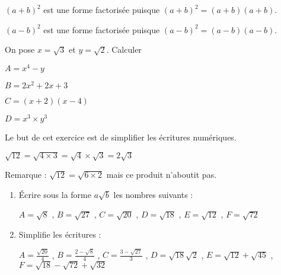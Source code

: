 \documentclass[10pt]{article}
\begin{document}
\begin{Rq}

$(a+b)^2$ est une forme factorisée puisque $(a+b)^2=(a+b)(a+b)$.

$(a-b)^2$ est une forme factorisée puisque $(a-b)^2=(a-b)(a-b)$.
\end{Rq}

 
\begin{minipage}{0.55\linewidth}
\end{minipage}
\begin{minipage}{0.45\linewidth}
\end{minipage}





On pose $x = \sqrt{3}$ et $y=\sqrt{2}$. Calculer

\begin{enumerate}
\begin{minipage}{0.25\linewidth}
\item $A = x^4-y$
\end{minipage}
\begin{minipage}{0.25\linewidth}
\item $B = 2x^2+2x+3$
\end{minipage}
\begin{minipage}{0.25\linewidth}
\item $C = (x+2)(x-4)$
\end{minipage}
\begin{minipage}{0.25\linewidth}
\item $D = x^3 \times y^3$
\end{minipage}
\end{enumerate}




Le but de cet exercice est de simplifier les écritures numériques.

\begin{Ex}
$\sqrt{12} = \sqrt{4 \times 3} = \sqrt{4} \times \sqrt{3}= 2 \sqrt{3}$

Remarque : $\sqrt{12} = \sqrt{6 \times 2}$ mais ce produit n'aboutit pas.
\end{Ex}
 

\begin{enumerate}
\item Écrire sous la forme $a\sqrt{b}$ les nombres suivants :

$A = \sqrt{8}$ , $B=\sqrt{27}$ , $C=\sqrt{20}$  , $D=\sqrt{18}$  , $E=\sqrt{12}$  , $F=\sqrt{72}$
\item Simplifie les écritures :

$A=\frac{\sqrt{20}}{4}$ , $B = \frac{2-\sqrt{8}}{4}$ , $C=\frac{3-\sqrt{27}}{3}$ , $D=\sqrt{18}\sqrt{2}$  , $E=\sqrt{12}+\sqrt{45}$  , $F=\sqrt{18} -\sqrt{72} +\sqrt{32}$

\end{enumerate}
\end{document}
